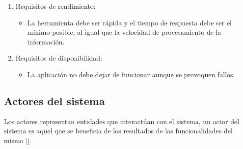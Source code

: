 \begin{enumerate}
\begin{itemize}
	\end{itemize}
\item Requisitos de rendimiento:
	\begin{itemize}
	\item La herramienta debe ser rápida y el tiempo de respuesta debe ser el mínimo posible, al igual que la velocidad de procesamiento de la información.
	\end{itemize}
\item Requisitos de disponibilidad:
	\begin{itemize}
	\item La aplicación no debe dejar de funcionar aunque se provoquen fallos.
	\end{itemize}
\end{enumerate}



\subsection{Actores del sistema}
Los actores representan entidades que interactúan con el sistema, un actor del sistema es aquel que se beneficia de los resultados de las funcionalidades del mismo [\cite{91}]. 

